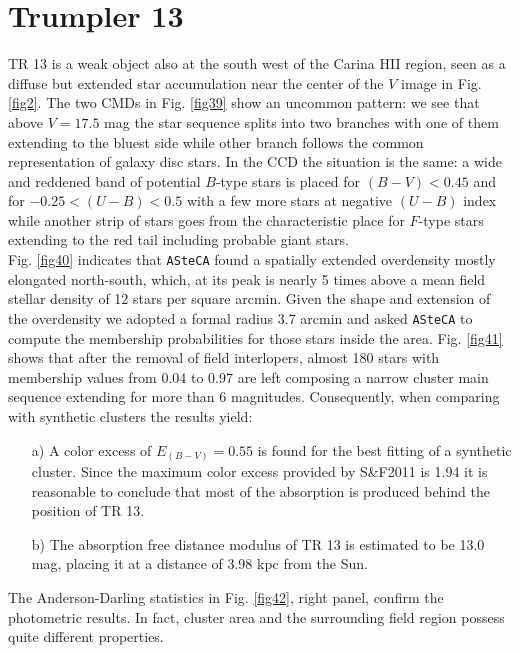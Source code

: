 \documentclass[draft]{aa}
\begin{document}
\section{Trumpler 13}

TR 13 is a weak object also at the south west of the Carina HII
region, seen as a diffuse but extended star accumulation near the center of the
$V$ image in Fig. \ref{fig2}. The two CMDs in Fig. \ref{fig39} show an uncommon
pattern: we see that above $V = 17.5$ mag the star sequence splits into two
branches with one of them extending to the bluest side while other branch
follows the common representation of galaxy disc stars.
In the CCD the situation is the same: a wide and reddened band of potential
$B$-type stars is placed for $(B-V)<0.45$ and for $-0.25<(U-B)<0.5$ with a few
more stars at negative $(U-B)$ index while another strip of stars goes from the
characteristic place for $F$-type stars extending to the red tail including
probable giant stars.\\

Fig. \ref{fig40} indicates that \texttt{ASteCA} found a spatially extended
overdensity mostly elongated north-south, which, at its peak is nearly 5 times
above a mean field stellar density of 12 stars per square arcmin. Given the
shape and extension of the overdensity we adopted a formal radius 3.7 arcmin and
asked \texttt{ASteCA} to compute the membership probabilities for those stars
inside the area. Fig. \ref{fig41} shows that after the removal of field
interlopers, almost 180 stars with membership values from 0.04 to 0.97 are left
composing a narrow cluster main sequence extending for more than 6 magnitudes.
Consequently, when comparing with synthetic clusters the results yield:

\begin{itemize}
\item [a)] A color excess of $E_{(B-V)}= 0.55$ is found for the best fitting of
a synthetic cluster. Since the maximum color excess provided by S\&F2011
is 1.94 it is reasonable to conclude that most of the absorption is produced
behind the position of TR 13.
\item [b)] The absorption free distance modulus of TR 13 is estimated to be
13.0 mag, placing it at a distance of 3.98 kpc from the Sun.
\end{itemize}

The Anderson-Darling statistics in Fig. \ref{fig42}, right panel, confirm the
photometric results. In fact, cluster area and the surrounding field region
possess quite different properties.\\
\end{document}
